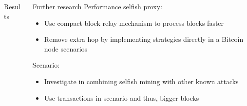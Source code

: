 \documentclass[final,hyperref={pdfpagelabels=true}]{beamer}
\begin{document}
\begin{frame}
\begin{columns}[t]
\begin{column}{.55\textwidth}
\begin{block}{Results}
      \end{block}  
                
    \end{column}

    \begin{column}{.35\textwidth}
    
      \begin{block}{Further research}
      	Performance selfish proxy:
      	\begin{itemize}
     		\item Use compact block relay mechanism to process blocks faster
     		\item Remove extra hop by implementing strategies directly in a Bitcoin node scenarios
      	\end{itemize}
      	Scenario:
      	\begin{itemize}
     		\item Investigate in combining selfish mining with other known attacks
     		\item Use transactions in scenario and thus, bigger blocks
      	\end{itemize}
      \end{block}

    \end{column}

  \end{columns}

\end{frame}
\end{document}
